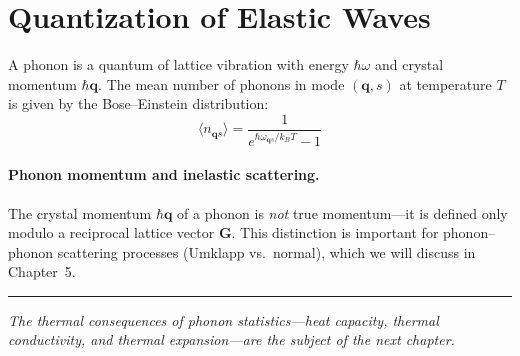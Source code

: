 \section{Quantization of Elastic Waves}

A phonon is a quantum of lattice vibration with energy $\hbar\omega$ and crystal momentum $\hbar\mathbf{q}$. The mean number of phonons in mode $(\mathbf{q}, s)$ at temperature $T$ is given by the Bose--Einstein distribution:
\begin{equation}
  \langle n_{\mathbf{q}s} \rangle = \frac{1}{e^{\hbar\omega_{\mathbf{q}s}/k_BT} - 1}
\end{equation}

\paragraph{Phonon momentum and inelastic scattering.} The crystal momentum $\hbar\mathbf{q}$ of a phonon is \textit{not} true momentum---it is defined only modulo a reciprocal lattice vector $\mathbf{G}$. This distinction is important for phonon--phonon scattering processes (Umklapp vs.\ normal), which we will discuss in Chapter~5.

\vspace{1cm}
\noindent\rule{\textwidth}{0.4pt}
\textit{The thermal consequences of phonon statistics---heat capacity, thermal conductivity, and thermal expansion---are the subject of the next chapter.}
